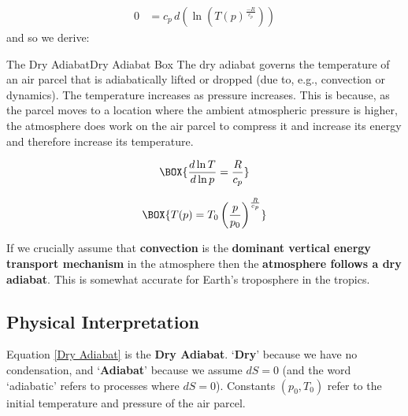 \begin{align*}
    0 & = c_p\,d\left(\ln \left(T(p)^\frac{-R}{c_p}\right)\right)
\end{align*}
and so we derive:
\begin{fact}{The Dry Adiabat}{Dry Adiabat Box}\label{Dry Adiabat Box}
    The dry adiabat governs the temperature of an air parcel that is adiabatically lifted or dropped (due to, e.g., convection or dynamics). The temperature increases as pressure increases. This is because, as the parcel moves to a location where the ambient atmospheric pressure is higher, the atmosphere does work on the air parcel to compress it and increase its energy and therefore increase its temperature. \vspace{2mm}

    \vspace{-4mm}
    \begin{minipage}{.48\linewidth}
        \begin{gather}
        \label{Dry Adiabat Slope}
        \BOX{
            \frac{d\ln T}{d\ln p}=\frac{R}{c_p}
        }
        \end{gather}
    \end{minipage}
    \hfill
    \begin{minipage}{.48\linewidth}
        \begin{gather}
        \label{Dry Adiabat}
        \BOX{
            T(p)=T_0\left(\frac{p}{p_0}\right)^\frac{R}{c_p}
        }
        \end{gather}
    \end{minipage}
        
    \vspace{2mm} If we crucially assume that \textbf{convection} is the \textbf{dominant vertical energy transport mechanism} in the atmosphere then the \textbf{atmosphere follows a dry adiabat}. This is somewhat accurate for Earth's troposphere in the tropics.
\end{fact}
\subsection{Physical Interpretation}

Equation \ref{Dry Adiabat} is the \textbf{Dry Adiabat}. `\textbf{Dry}' because we have no condensation, and `\textbf{Adiabat}' because we assume \(dS=0\) (and the word `adiabatic' refers to processes where \(dS=0\)). Constants \((p_0,T_0)\) refer to the initial temperature and pressure of the air parcel. 

